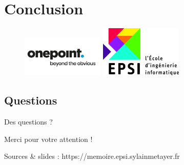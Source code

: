 \section{Conclusion}
\begin{frame}{\secname}
    \begin{figure}[htb]
		\centering
		\includegraphics[width=0.35\textwidth]{img/onepoint.jpg}
		\includegraphics[width=0.35\textwidth]{img/epsi.jpg}
	\end{figure}
\end{frame}

\subsection{Questions}
\begin{frame}{Des questions ?}

Merci pour votre attention !

Sources \& slides : https://memoire.epsi.sylainmetayer.fr

\centering {}

\end{frame}

\begin{frame}[noframenumbering]{}
\end{frame}